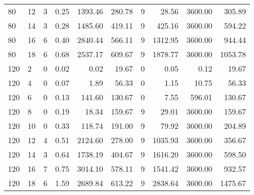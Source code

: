 \begin{appendices}
\begin{table*}[h]
\begin{center}
\begin{tabular} {l l | r r r r | r r r r}
80 & 12                                 &   3             & 0.25          &  1393.46    &  280.78      &  9            &  28.56   &  3600.00    &  305.89           \\ 
80 & 14                                 &   3             & 0.28          &  1485.60    &  419.11      &  9            &  425.16  &  3600.00    &  594.22           \\ 
80 & 16                                 &   6             & 0.40          &  2840.44    &  566.11      &  9            &  1312.95 &  3600.00    &  944.44           \\ 
80 & 18                                 &   6             & 0.68          &  2537.17    &  609.67      &  9            &  1878.77 &  3600.00    &  1053.78          \\ 
120 & 2                                 &   0             & 0.02          &  0.02       &  19.67       &  0            &  0.05    &  0.12       &  19.67            \\ 
120 & 4                                 &   0             & 0.07          &  1.89       &  56.33       &  0            &  1.15    &  10.75      &  56.33            \\ 
120 & 6                                 &   0             & 0.13          &  141.60     &  130.67      &  0            &  7.55    &  596.01     &  130.67           \\ 
120 & 8                                 &   0             & 0.19          &  18.34      &  159.67      &  9            &  29.01   &  3600.00    &  159.67           \\ 
120 & 10                                &   0             & 0.33          &  118.74     &  191.00      &  9            &  79.92   &  3600.00    &  204.89           \\ 
120 & 12                                &   4             & 0.51          &  2124.60    &  278.00      &  9            &  1035.93 &  3600.00    &  356.67           \\ 
120 & 14                                &   3             & 0.64          &  1738.19    &  404.67      &  9            &  1616.20 &  3600.00    &  598.50           \\ 
120 & 16                                &   7             & 0.75          &  3014.10    &  578.11      &  9            &  1541.42 &  3600.00    &  932.57           \\ 
120 & 18                                &   6             & 1.59          &  2689.84    &  613.22      &  9            &  2838.64 &  3600.00    &  1475.67          \\ 

\end{tabular}
\end{center}
\end{table*}
\end{appendices}
